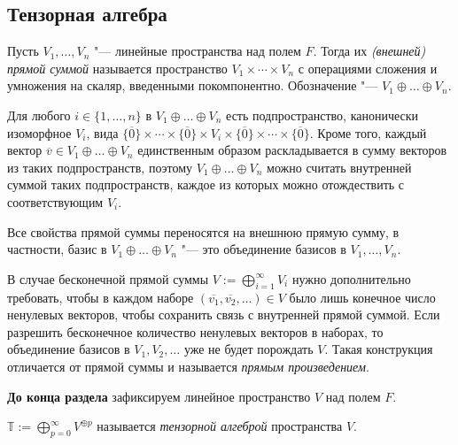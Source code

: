 \subsection{Тензорная алгебра}

\begin{definition}
	Пусть $V_1, \dots, V_n$ "--- линейные пространства над полем $F$. Тогда их \textit{(внешней) прямой суммой} называется пространство $V_1 \times \dotsb \times V_n$ с операциями сложения и умножения на скаляр, введенными покомпонентно. Обозначение "--- $V_1 \oplus \dots \oplus V_n$.
\end{definition}

\begin{note}
	Для любого $i \in \{1, 
	\dotsc, n\}$ в $V_1 \oplus \dots \oplus V_n$ есть подпространство, канонически изоморфное $V_i$, вида $\{\overline{0}\} \times \dotsb \times \{\overline{0}\} \times V_i \times \{\overline{0}\} \times \dotsb \times \{\overline{0}\}$. Кроме того, каждый вектор $\overline{v} \in V_1 \oplus \dots \oplus V_n$ единственным образом раскладывается в сумму векторов из таких подпространств, поэтому $V_1 \oplus \dots \oplus V_n$ можно считать внутренней суммой таких подпространств, каждое из которых можно отождествить с соответствующим $V_i$.
\end{note}

\begin{corollary}
	Все свойства прямой суммы переносятся на внешнюю прямую сумму, в частности, базис в $V_1 \oplus \dots \oplus V_n$ "--- это объединение базисов в $V_1, \dots, V_n$.
\end{corollary}

\begin{note}
	В случае бесконечной прямой суммы $V := \bigoplus_{i = 1}^\infty V_i$ нужно дополнительно требовать, чтобы в каждом наборе $(\overline{v_1}, \overline{v_2}, \dotsc) \in V$ было лишь конечное число ненулевых векторов, чтобы сохранить связь с внутренней прямой суммой. Если разрешить бесконечное количество ненулевых векторов в наборах, то объединение базисов в $V_1, V_2, \dotsc$ уже не будет порождать $V$. Такая конструкция отличается от прямой суммы и называется \textit{прямым произведением}.
\end{note}

\textbf{До конца раздела} зафиксируем линейное пространство $V$ над полем $F$.

\begin{definition}
	$\mathbb{T} := \bigoplus_{p = 0}^\infty V^{\oplus p}$ называется \textit{тензорной алгеброй} пространства $V$.
\end{definition}

